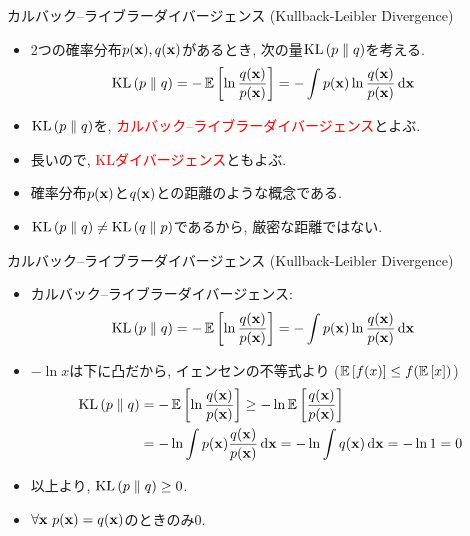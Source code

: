 \documentclass[dvipdfmx,notheorems,t]{beamer}
\begin{document}
\begin{frame}{カルバック--ライブラーダイバージェンス (Kullback-Leibler Divergence)}
\begin{itemize}
  \item 2つの確率分布$p(\vb{x}), q(\vb{x})$があるとき, 次の量$\operatorname{KL} \left( p \parallel q \right)$を考える.
  \begin{align*}
    \operatorname{KL} \left( p \parallel q \right) &= -\operatorname{\mathbb{E}} \left[ \ln \frac{q(\vb{x})}{p(\vb{x})} \right]
      = -\int p(\vb{x}) \ln \frac{q(\vb{x})}{p(\vb{x})} \dd{\vb{x}}
  \end{align*}
  \item $\operatorname{KL} \left( p \parallel q \right)$を, \textcolor{red}{カルバック--ライブラーダイバージェンス}とよぶ.
  \item 長いので, \textcolor{red}{KLダイバージェンス}ともよぶ.
  \item 確率分布$p(\vb{x})$と$q(\vb{x})$との距離のような概念である.
  \item $\operatorname{KL} \left( p \parallel q \right) \neq \operatorname{KL} \left( q \parallel p \right)$であるから, 厳密な距離ではない.
\end{itemize}
\end{frame}

\begin{frame}{カルバック--ライブラーダイバージェンス (Kullback-Leibler Divergence)}
\begin{itemize}
  \item カルバック--ライブラーダイバージェンス:
  \begin{align*}
    \operatorname{KL} \left( p \parallel q \right) &= -\operatorname{\mathbb{E}} \left[ \ln \frac{q(\vb{x})}{p(\vb{x})} \right]
      = -\int p(\vb{x}) \ln \frac{q(\vb{x})}{p(\vb{x})} \dd{\vb{x}}
  \end{align*}
  \item $-\ln x$は下に凸だから, イェンセンの不等式より ($\operatorname{\mathbb{E}} \left[ f(x) \right] \le f(\operatorname{\mathbb{E}} \left[ x \right])$)
  \begin{align*}
    \operatorname{KL} \left( p \parallel q \right) &= -\operatorname{\mathbb{E}} \left[ \ln \frac{q(\vb{x})}{p(\vb{x})} \right]
      \ge -\ln \operatorname{\mathbb{E}} \left[ \frac{q(\vb{x})}{p(\vb{x})} \right] \\
      &= -\ln \int p(\vb{x}) \frac{q(\vb{x})}{p(\vb{x})} \dd{\vb{x}}
      = -\ln \int q(\vb{x}) \dd{\vb{x}} = -\ln 1 = 0
  \end{align*}
  \item 以上より, $\operatorname{KL} \left( p \parallel q \right) \ge 0$.
  \item $\forall \vb{x} \ p(\vb{x}) = q(\vb{x})$のときのみ$0$.
\end{itemize}
\end{frame}
\end{document}
